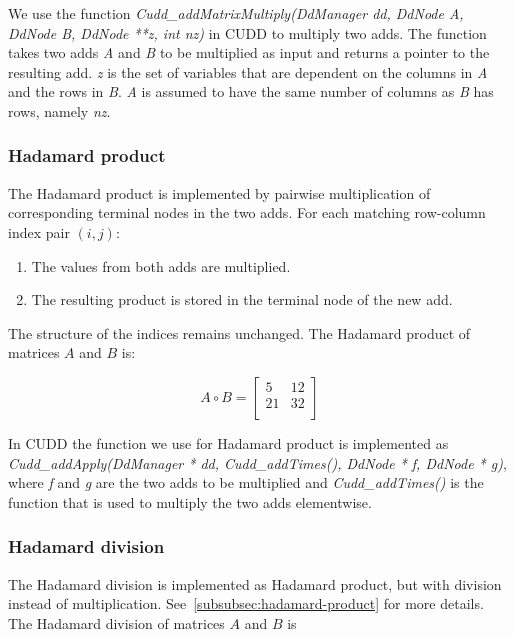 We use the function \textit{Cudd\_addMatrixMultiply(DdManager dd, DdNode A, DdNode B, DdNode **z, int nz)} in CUDD to multiply two \glspl{add}. 
The function takes two \glspl{add} \textit{A} and \textit{B} to be multiplied as input and returns a pointer to the resulting \gls{add}.
\textit{z} is the set of variables that are dependent on the columns in \textit{A} and the rows in \textit{B}.
\textit{A} is assumed to have the same number of columns as \textit{B} has rows, namely \textit{nz}.

\subsubsection{Hadamard product}\label{subsubsec:hadamard-product}
The Hadamard product is implemented by pairwise multiplication of corresponding terminal nodes in the two \glspl{add}. For each matching row-column index pair $(i, j)$:
\begin{enumerate}
    \item The values from both \glspl{add} are multiplied.
    \item The resulting product is stored in the terminal node of the new \gls{add}.
\end{enumerate}
The structure of the indices remains unchanged.
The Hadamard product of matrices $A$ and $B$ is:

\[
    A \circ B = \begin{bmatrix}
        5  & 12 \\
        21 & 32 \\
    \end{bmatrix}
\]

In CUDD the function we use for Hadamard product is implemented as \textit{Cudd\_addApply(DdManager * dd, Cudd\_addTimes(), DdNode * f, DdNode * g)}, where \textit{f} and \textit{g} are the two \glspl{add} to be multiplied and \textit{Cudd\_addTimes()} is the function that is used to multiply the two \glspl{add} elementwise.

\subsubsection{Hadamard division}
The Hadamard division is implemented as Hadamard product, but with division instead of multiplication. See~\autoref{subsubsec:hadamard-product} for more details.
The Hadamard division of matrices $A$ and $B$ is


